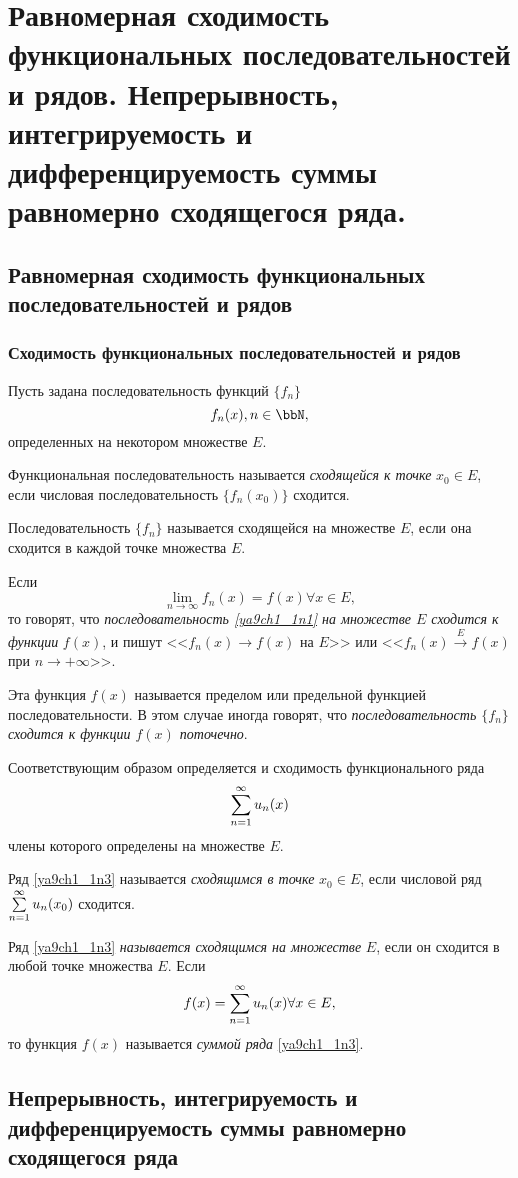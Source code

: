 \chapter{Равномерная сходимость функциональных последовательностей и рядов. Непрерывность, интегрируемость и дифференцируемость суммы равномерно сходящегося ряда.}

\section{Равномерная сходимость функциональных последовательностей и рядов}

\subsection{Сходимость функциональных последовательностей и рядов}

Пусть задана последовательность функций $\{f_n\}$
\begin{equation} \label{ya9ch1_1n1}
f_n(x), n\in \bbN, 
\end{equation}
определенных на некотором множестве $E$.
\begin{defn} Функциональная последовательность называется \textit{сходящейся к точке} $x_0 \in E$, если числовая последовательность $\{f_n(x_0)\}$ сходится.

Последовательность $\{f_n\}$ называется сходящейся на множестве $E$, если она сходится в каждой точке множества $E$.

Если
\begin{equation} \label{ya9ch1_1n2}
\lim_{n \to \infty} f_n(x) = f(x) \forall x\in E,
\end{equation}
то говорят, что \textit{последовательность \eqref{ya9ch1_1n1} на множестве $E$ сходится к функции} $f(x)$, и пишут <<$f_n(x)\to f(x)$ на $E$>> или <<$f_n(x) \xrightarrow{E} f(x)$ при $n \to +\infty $>>.

Эта функция $f(x)$ называется пределом или предельной функцией последовательности. В этом случае иногда говорят, что \textit{последовательность $\{f_n\}$ сходится к функции $f(x)$ поточечно}.
\end{defn}

Соответствующим образом определяется и сходимость функционального ряда
\begin{equation} \label{ya9ch1_1n3}
\sum_{n=1}^{\infty}\limits u_n(x)
\end{equation}
члены которого определены на множестве $E$.
\begin{defn} Ряд \eqref{ya9ch1_1n3} называется \textit{сходящимся в точке} $x_0 \in E$, если числовой ряд $\sum_{n=1}^{\infty}\limits u_n(x_0)$ сходится.

Ряд \eqref{ya9ch1_1n3} \textit{называется сходящимся на множестве} $E$, если он сходится в любой точке множества $E$. Если
\begin{equation} \label{ya9ch1_1n4}
f(x)=\sum_{n=1}^{\infty}\limits u_n(x) \forall x \in E,
\end{equation}
то функция $f(x)$ называется \textit{суммой ряда} \eqref{ya9ch1_1n3}.
\end{defn}

\section{Непрерывность, интегрируемость и дифференцируемость суммы равномерно сходящегося ряда}